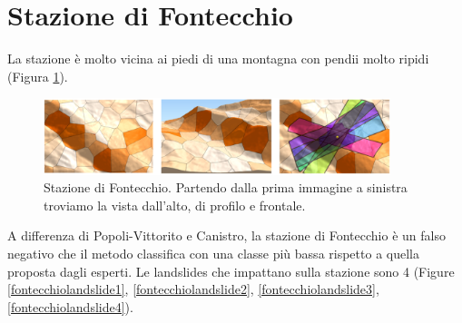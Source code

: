 \newpage
\section{Stazione di Fontecchio}
La stazione è molto vicina ai piedi di una montagna con pendii molto ripidi (Figura \ref{Fontecchio_Final}).  

	\begin{figure}[h]
	\centering
	\includegraphics[width=0.9\textwidth]{images/FontecchioFinal}
	\caption{Stazione di Fontecchio. Partendo dalla prima immagine a sinistra  troviamo la vista dall'alto, di profilo e frontale.}
	\label{Fontecchio_Final}
\end{figure}

A differenza di Popoli-Vittorito e Canistro, la stazione di Fontecchio è un falso negativo che il metodo classifica con una classe più bassa rispetto a quella proposta dagli esperti. Le landslides che impattano sulla stazione sono 4 (Figure \ref{fontecchiolandslide1}, \ref{fontecchiolandslide2}, \ref{fontecchiolandslide3}, \ref{fontecchiolandslide4}).

